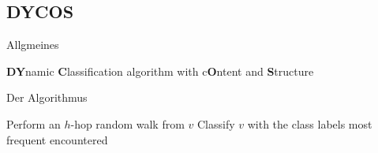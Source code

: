 \subsection{DYCOS}
\begin{frame}{Allgmeines}
    \begin{center}
    \Huge
    \textbf{DY}namic \textbf{C}lassification algorithm with 
    c\textbf{O}ntent and \textbf{S}tructure
    \end{center}
\end{frame}

\begin{frame}{Der Algorithmus}
\begin{algorithm}[H]
	\begin{algorithmic}
			 
				    \State Perform an $h$-hop random walk from $v$
			    \EndFor
                \State Classify $v$ with the class labels most frequent
                       encountered
			\EndFor
		\EndFunction
	\end{algorithmic}
\caption{Tarjans Algorithmus zur bestimmung starker Zusammenhangskomponenten}
\label{alg:seq1}
\end{algorithm}
\end{frame}


